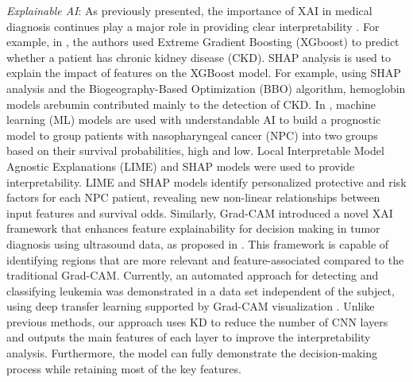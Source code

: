 \noindent\textit{Explainable AI}: As previously presented, the importance of XAI in medical diagnosis continues play a major role in providing clear interpretability \cite{chaddad2023survey}. For example, in \cite{raihan2023detection}, the authors used Extreme Gradient Boosting (XGboost) to predict whether a patient has chronic kidney disease (CKD). SHAP analysis is used to explain the impact of features on the XGBoost model. For example, using SHAP analysis and the Biogeography-Based Optimization (BBO) algorithm, hemoglobin models arebumin contributed mainly to the detection of CKD. In \cite{alabi2023machine}, machine learning (ML) models are used with understandable AI to build a prognostic model to group patients with nasopharyngeal cancer (NPC) into two groups based on their survival probabilities, high and low. Local Interpretable Model Agnostic Explanations (LIME) and SHAP models were used to provide interpretability. LIME and SHAP models identify personalized protective and risk factors for each NPC patient, revealing new non-linear relationships between input features and survival odds. Similarly, Grad-CAM introduced a novel XAI framework that enhances feature explainability for decision making in tumor diagnosis using ultrasound data, as proposed in \cite{song2023new}. This framework is capable of identifying regions that are more relevant and feature-associated compared to the traditional Grad-CAM. Currently, an automated approach for detecting and classifying leukemia was demonstrated in a data set independent of the subject, using deep transfer learning supported by Grad-CAM visualization \cite{abhishek2023automated}. Unlike previous methods, our approach uses KD to reduce the number of CNN layers and outputs the main features of each layer to improve the interpretability analysis. Furthermore, the model can fully demonstrate the decision-making process while retaining most of the key features.